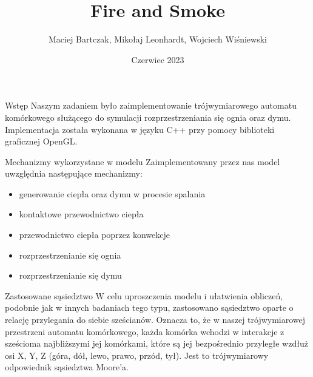 \documentclass{beamer}
\title{Fire and Smoke}
\author{Maciej Bartczak, Mikołaj Leonhardt, Wojciech Wiśniewski}
\date{Czerwiec 2023}
\begin{document}
\maketitle

\begin{frame}{Wstęp}
    Naszym zadaniem było zaimplementowanie trójwymiarowego automatu komórkowego służącego do symulacji rozprzestrzeniania się ognia oraz dymu. Implementacja została wykonana w języku C++ przy pomocy biblioteki graficznej OpenGL.
\end{frame}

\begin{frame}{Mechanizmy wykorzystane w modelu}
    Zaimplementowany przez nas model uwzględnia następujące mechanizmy:
    \begin{itemize}
        \item generowanie ciepła oraz dymu w procesie spalania
        \item kontaktowe przewodnictwo ciepła
        \item przewodnictwo ciepła poprzez konwekcje
        \item rozprzestrzenianie się ognia
        \item rozprzestrzenianie się dymu
    \end{itemize}

\end{frame}

\begin{frame}{Zastosowane sąsiedztwo}
    W celu uproszczenia modelu i ułatwienia obliczeń, podobnie jak w innych badaniach tego typu, zastosowano sąsiedztwo oparte o relację przylegania do siebie sześcianów. Oznacza to, że w naszej trójwymiarowej przestrzeni automatu komórkowego, każda komórka wchodzi w interakcje z sześcioma najbliższymi jej komórkami, które są jej bezpośrednio przyległe wzdłuż osi X, Y, Z (góra, dół, lewo, prawo, przód, tył). Jest to trójwymiarowy odpowiednik sąsiedztwa Moore'a.
\end{frame}
\end{document}

